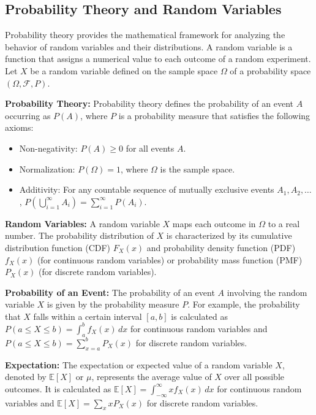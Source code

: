 \documentclass[12pt]{book} %
\begin{document}
\subsection{Probability Theory and Random Variables}
Probability theory provides the mathematical framework for analyzing the behavior of random variables and their distributions. A random variable is a function that assigns a numerical value to each outcome of a random experiment. Let \(X\) be a random variable defined on the sample space \(\Omega\) of a probability space \((\Omega, \mathcal{F}, P)\).

\textbf{Probability Theory:} Probability theory defines the probability of an event \(A\) occurring as \(P(A)\), where \(P\) is a probability measure that satisfies the following axioms:
\begin{itemize}
    \item Non-negativity: \(P(A) \geq 0\) for all events \(A\).
    \item Normalization: \(P(\Omega) = 1\), where \(\Omega\) is the sample space.
    \item Additivity: For any countable sequence of mutually exclusive events \(A_1, A_2, \ldots\), \(P\left(\bigcup_{i=1}^\infty A_i\right) = \sum_{i=1}^\infty P(A_i)\).
\end{itemize}

\textbf{Random Variables:} A random variable \(X\) maps each outcome in \(\Omega\) to a real number. The probability distribution of \(X\) is characterized by its cumulative distribution function (CDF) \(F_X(x)\) and probability density function (PDF) \(f_X(x)\) (for continuous random variables) or probability mass function (PMF) \(P_X(x)\) (for discrete random variables).

\textbf{Probability of an Event:} The probability of an event \(A\) involving the random variable \(X\) is given by the probability measure \(P\). For example, the probability that \(X\) falls within a certain interval \([a, b]\) is calculated as \(P(a \leq X \leq b) = \int_a^b f_X(x) \, dx\) for continuous random variables and \(P(a \leq X \leq b) = \sum_{x=a}^b P_X(x)\) for discrete random variables.

\textbf{Expectation:} The expectation or expected value of a random variable \(X\), denoted by \(\mathbb{E}[X]\) or \(\mu\), represents the average value of \(X\) over all possible outcomes. It is calculated as \(\mathbb{E}[X] = \int_{-\infty}^\infty x f_X(x) \, dx\) for continuous random variables and \(\mathbb{E}[X] = \sum_{x} x P_X(x)\) for discrete random variables.
\end{document}
